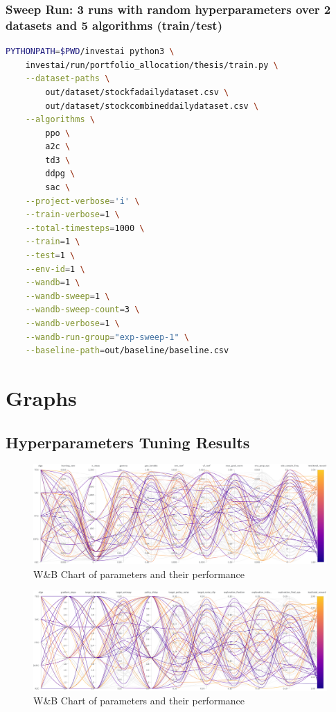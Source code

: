 \documentclass[../xlapes02]{subfiles}
\begin{document}
    \subsection{Sweep Run: 3 runs with random hyperparameters over 2 datasets and 5 algorithms (train/test)}\label{subsec:sweep-run:-3-runs-with-random-hyperparameters-over-2-datasets-and-5-algorithms-(train/test)}
    \begin{lstlisting}[language=bash,label={lst:sweep-train}]
PYTHONPATH=$PWD/investai python3 \
    investai/run/portfolio_allocation/thesis/train.py \
    --dataset-paths \
        out/dataset/stockfadailydataset.csv \
        out/dataset/stockcombineddailydataset.csv \
    --algorithms \
        ppo \
        a2c \
        td3 \
        ddpg \
        sac \
    --project-verbose='i' \
    --train-verbose=1 \
    --total-timesteps=1000 \
    --train=1 \
    --test=1 \
    --env-id=1 \
    --wandb=1 \
    --wandb-sweep=1 \
    --wandb-sweep-count=3 \
    --wandb-verbose=1 \
    --wandb-run-group="exp-sweep-1" \
    --baseline-path=out/baseline/baseline.csv
    \end{lstlisting}


    \chapter{Graphs}\label{ch:graphs}
    \section{Hyperparameters Tuning Results}\label{sec:hyperparameters-tuning-results}
    \begin{figure}[H]
        \centering
        \includegraphics[width=\linewidth]{image/wandb/wb1}
        \caption{W\&B Chart of parameters and their performance}
        \label{fig:wb-chart1}
    \end{figure}

    \begin{figure}[H]
        \centering
        \includegraphics[width=\linewidth]{image/wandb/wb2}
        \caption{W\&B Chart of parameters and their performance}
        \label{fig:wb-chart2}
    \end{figure}
\end{document}
